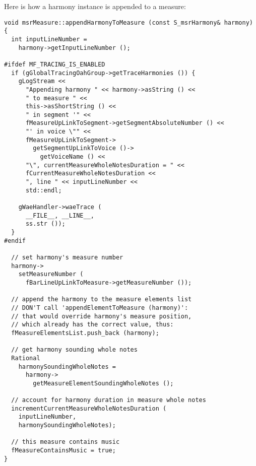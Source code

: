 Here is how a harmony instance is appended to a measure:
\begin{lstlisting}[language=CPlusPlus]
void msrMeasure::appendHarmonyToMeasure (const S_msrHarmony& harmony)
{
  int inputLineNumber =
    harmony->getInputLineNumber ();

#ifdef MF_TRACING_IS_ENABLED
  if (gGlobalTracingOahGroup->getTraceHarmonies ()) {
    gLogStream <<
      "Appending harmony " << harmony->asString () <<
      " to measure " <<
      this->asShortString () <<
      " in segment '" <<
      fMeasureUpLinkToSegment->getSegmentAbsoluteNumber () <<
      "' in voice \"" <<
      fMeasureUpLinkToSegment->
        getSegmentUpLinkToVoice ()->
          getVoiceName () <<
      "\", currentMeasureWholeNotesDuration = " <<
      fCurrentMeasureWholeNotesDuration <<
      ", line " << inputLineNumber <<
      std::endl;

    gWaeHandler->waeTrace (
      __FILE__, __LINE__,
      ss.str ());
  }
#endif

  // set harmony's measure number
  harmony->
    setMeasureNumber (
      fBarLineUpLinkToMeasure->getMeasureNumber ());

  // append the harmony to the measure elements list
  // DON'T call 'appendElementToMeasure (harmony)':
  // that would override harmony's measure position,
  // which already has the correct value, thus:
  fMeasureElementsList.push_back (harmony);

  // get harmony sounding whole notes
  Rational
    harmonySoundingWholeNotes =
      harmony->
        getMeasureElementSoundingWholeNotes ();

  // account for harmony duration in measure whole notes
  incrementCurrentMeasureWholeNotesDuration (
    inputLineNumber,
    harmonySoundingWholeNotes);

  // this measure contains music
  fMeasureContainsMusic = true;
}
\end{lstlisting}

